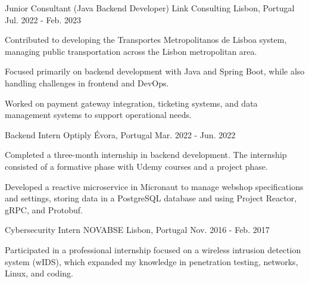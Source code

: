 \begin{cventries}
  \vspace{0.4cm}


  \cventry
  {Junior Consultant (Java Backend Developer)} %
  {Link Consulting} %
  {Lisbon, Portugal} %
  {Jul. 2022 - Feb. 2023} %
  { %
    \begin{cvitems}
      \item {Contributed to developing the Transportes Metropolitanos de Lisboa system, managing public transportation across the Lisbon metropolitan area.}
      \item {Focused primarily on backend development with Java and Spring Boot, while also handling challenges in frontend and DevOps.}
      \item {Worked on payment gateway integration, ticketing systems, and data management systems to support operational needs.}
    \end{cvitems}
  }

  \vspace{0.4cm}


  \cventry
  {Backend Intern} %
  {Optiply} %
  {Évora, Portugal} %
  {Mar. 2022 - Jun. 2022} %
  { %
    \begin{cvitems}
      \item {Completed a three-month internship in backend development. The internship consisted of a formative phase with Udemy courses and a project phase.}
      \item {Developed a reactive microservice in Micronaut to manage webshop specifications and settings, storing data in a PostgreSQL database and using Project Reactor, gRPC, and Protobuf.}
    \end{cvitems}
  }

  \vspace{0.4cm}


  \cventry
  {Cybersecurity Intern} %
  {NOVABSE} %
  {Lisbon, Portugal} %
  {Nov. 2016 - Feb. 2017} %
  { %
    \begin{cvitems}
      \item {Participated in a professional internship focused on a wireless intrusion detection system (wIDS), which expanded my knowledge in penetration testing, networks, Linux, and coding.}
    \end{cvitems}
  }


\end{cventries}
